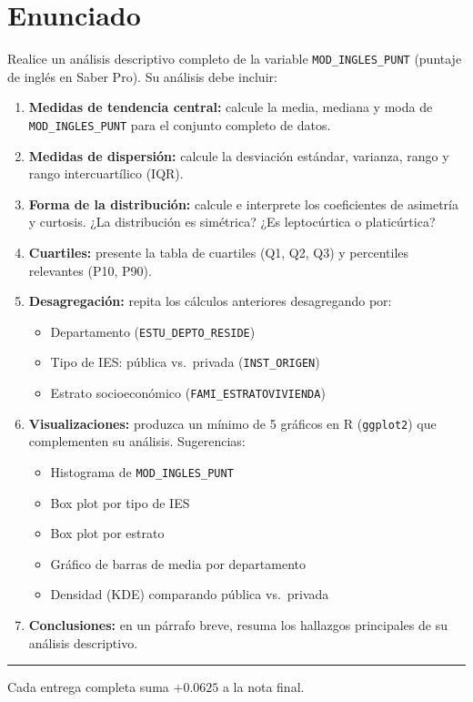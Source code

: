 \documentclass[11pt, a4paper]{article}
\begin{document}
\section*{Enunciado}

Realice un an\'alisis descriptivo completo de la variable \texttt{MOD\_INGLES\_PUNT}
(puntaje de ingl\'es en Saber Pro).
Su an\'alisis debe incluir:

\begin{enumerate}[label=\alph*)]
  \item \textbf{Medidas de tendencia central:} calcule la media, mediana y moda de
        \texttt{MOD\_INGLES\_PUNT} para el conjunto completo de datos.

  \item \textbf{Medidas de dispersi\'on:} calcule la desviaci\'on est\'andar, varianza,
        rango y rango intercuart\'ilico (IQR).

  \item \textbf{Forma de la distribuci\'on:} calcule e interprete los coeficientes de
        asimetr\'ia y curtosis. ¿La distribuci\'on es sim\'etrica? ¿Es leptoc\'urtica
        o platic\'urtica?

  \item \textbf{Cuartiles:} presente la tabla de cuartiles (Q1, Q2, Q3) y percentiles
        relevantes (P10, P90).

  \item \textbf{Desagregaci\'on:} repita los c\'alculos anteriores desagregando por:
        \begin{itemize}
          \item Departamento (\texttt{ESTU\_DEPTO\_RESIDE})
          \item Tipo de IES: p\'ublica vs.\ privada (\texttt{INST\_ORIGEN})
          \item Estrato socioecon\'omico (\texttt{FAMI\_ESTRATOVIVIENDA})
        \end{itemize}

  \item \textbf{Visualizaciones:} produzca un m\'inimo de 5 gr\'aficos en R
        (\texttt{ggplot2}) que complementen su an\'alisis. Sugerencias:
        \begin{itemize}
          \item Histograma de \texttt{MOD\_INGLES\_PUNT}
          \item Box plot por tipo de IES
          \item Box plot por estrato
          \item Gr\'afico de barras de media por departamento
          \item Densidad (KDE) comparando p\'ublica vs.\ privada
        \end{itemize}

  \item \textbf{Conclusiones:} en un p\'arrafo breve, resuma los hallazgos
        principales de su an\'alisis descriptivo.
\end{enumerate}

\vspace{10pt}
\rule{\linewidth}{0.4pt}
\begin{center}
{\small Cada entrega completa suma $+0.0625$ a la nota final.}
\end{center}
\end{document}
